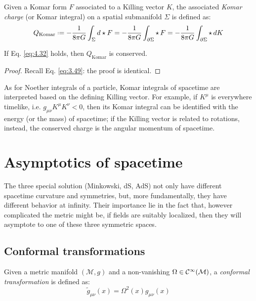 \begin{definition}
  Given a Komar form $ F $ associated to a Killing vector $ K $, the associated \textit{Komar charge} (or Komar integral) on a spatial submanifold $ \Sigma $ is defined as:
  \begin{equation}
    Q_{\text{Komar}} \defeq - \frac{1}{8\pi G} \int_\Sigma d \star F = - \frac{1}{8\pi G} \int_{\pa \Sigma} \star\, F = - \frac{1}{8\pi G} \int_{\pa \Sigma} \star\, dK
    \label{eq:4.33}
  \end{equation}
\end{definition}

\begin{proposition}
  If Eq. \ref{eq:4.32} holds, then $ Q_{\text{Komar}} $ is conserved.
\end{proposition}
\begin{proof}
  Recall Eq. \ref{eq:3.49}: the proof is identical.
\end{proof}

As for Noether integrals of a particle, Komar integrals of spacetime are interpreted based on the defining Killing vector. For example, if $ K^\mu $ is everywhere timelike, i.e. $ g_{\mu \nu} K^\mu K^\nu < 0 $, then its Komar integral can be identified with the energy (or the mass) of spacetime; if the Killing vector is related to rotations, instead, the conserved charge is the angular momentum of spacetime.

\section{Asymptotics of spacetime}

The three special solution (Minkowski, dS, AdS) not only have different spacetime curvature and symmetries, but, more fundamentally, they have different behavior at infinity. Their importance lie in the fact that, however complicated the metric might be, if fields are suitably localized, then they will asymptote to one of these three symmetric spaces.

\subsection{Conformal transformations}

\begin{definition}
  Given a metric manifold $ (\mathcal{M},g) $ and a non-vanishing $ \Omega \in \mathcal{C}^{\infty}(\mathcal{M}) $, a \textit{conformal transformation} is defined as:
  \begin{equation}
    \tilde{g}_{\mu \nu}(x) = \Omega^2(x) g_{\mu \nu}(x)
    \label{eq:4.34}
  \end{equation}
\end{definition}

